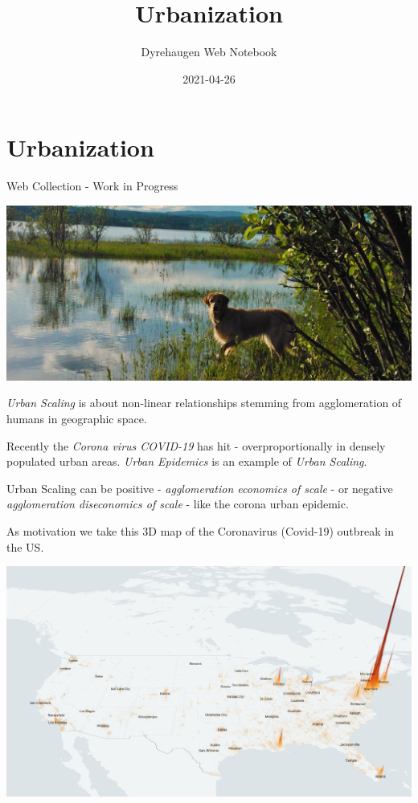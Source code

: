 \documentclass[
]{book}
\title{Urbanization}
\author{Dyrehaugen Web Notebook}
\date{2021-04-26}
\begin{document}
\maketitle

{
\setcounter{tocdepth}{1}
\tableofcontents
}
\hypertarget{urbanization}{%
\chapter{Urbanization}\label{urbanization}}

Web Collection - Work in Progress

\includegraphics{fig/zelda.jpg}

\emph{Urban Scaling} is about non-linear relationships stemming from agglomeration of humans
in geographic space.

Recently the \emph{Corona virus COVID-19} has hit - overproportionally in densely populated urban areas.
\emph{Urban Epidemics} is an example of \emph{Urban Scaling}.

Urban Scaling can be positive - \emph{agglomeration economics of scale} - or negative
\emph{agglomeration diseconomics of scale} - like the corona urban epidemic.

As motivation we take this 3D map of the Coronavirus (Covid-19) outbreak in the US.

\includegraphics{fig/Corona_Cases_pc_US_3D.jpeg}
\end{document}
